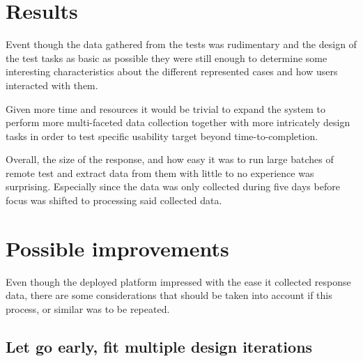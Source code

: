 %


\section{Results}

  Event though the data gathered from the tests was rudimentary and the
  design of the test tasks as basic as possible they were still enough to
  determine some interesting characteristics about the different represented
  cases and how users interacted with them.

  Given more time and resources it would be trivial to expand the system to
  perform more multi-faceted data collection together with more intricately
  design tasks in order to test specific usability target beyond
  time-to-completion.

  Overall, the size of the response, and how easy it was to run large batches
  of remote test and extract data from them with little to no experience was
  surprising. Especially since the data was only collected during five days
  before focus was shifted to processing said collected data.

%

\section{Possible improvements}

  Even though the deployed platform impressed with the ease it collected
  response data, there are some considerations that should be taken into
  account if this process, or similar was to be repeated.

  \subsection{Let go early, fit multiple design iterations}

